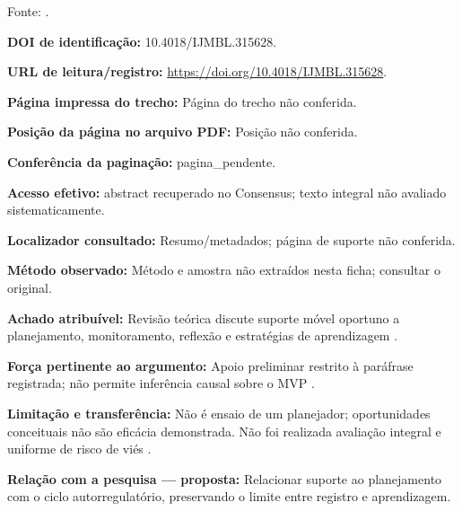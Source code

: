 Fonte: \citet{education_baars2022}.

\noindent\textbf{DOI de identificação:} 10.4018/IJMBL.315628.\par\medskip

\noindent\textbf{URL de leitura/registro:} \url{https://doi.org/10.4018/IJMBL.315628}.\par\medskip

\noindent\textbf{Página impressa do trecho:} Página do trecho não conferida.\par\medskip

\noindent\textbf{Posição da página no arquivo PDF:} Posição não conferida.\par\medskip

\noindent\textbf{Conferência da paginação:} pagina\_pendente.\par\medskip

\noindent\textbf{Acesso efetivo:} abstract recuperado no Consensus; texto integral não avaliado sistematicamente.\par\medskip

\noindent\textbf{Localizador consultado:} Resumo/metadados; página de suporte não conferida.\par\medskip

\noindent\textbf{Método observado:} Método e amostra não extraídos nesta ficha; consultar o original.\par\medskip

\noindent\textbf{Achado atribuível:} Revisão teórica discute suporte móvel oportuno a planejamento, monitoramento, reflexão e estratégias de aprendizagem \citep{education_baars2022}.\par\medskip

\noindent\textbf{Força pertinente ao argumento:} Apoio preliminar restrito à paráfrase registrada; não permite inferência causal sobre o MVP \citep{education_baars2022}.\par\medskip

\noindent\textbf{Limitação e transferência:} Não é ensaio de um planejador; oportunidades conceituais não são eficácia demonstrada. Não foi realizada avaliação integral e uniforme de risco de viés \citep{education_baars2022}.\par\medskip

\noindent\textbf{Relação com a pesquisa — proposta:} Relacionar suporte ao planejamento com o ciclo autorregulatório, preservando o limite entre registro e aprendizagem.\par\medskip

